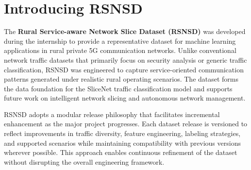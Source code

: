 \documentclass[12pt,a4paper]{report}
\begin{document}
\section{Introducing RSNSD}
\label{sec:rsnsd}

The \textbf{Rural Service-aware Network Slice Dataset (RSNSD)} was developed during the internship to provide a representative dataset for machine learning applications in rural private 5G communication networks. Unlike conventional network traffic datasets that primarily focus on security analysis or generic traffic classification, RSNSD was engineered to capture service-oriented communication patterns generated under realistic rural operating scenarios. The dataset forms the data foundation for the SliceNet traffic classification model and supports future work on intelligent network slicing and autonomous network management.

RSNSD adopts a modular release philosophy that facilitates incremental enhancement as the major project progresses. Each dataset release is versioned to reflect improvements in traffic diversity, feature engineering, labeling strategies, and supported scenarios while maintaining compatibility with previous versions wherever possible. This approach enables continuous refinement of the dataset without disrupting the overall engineering framework.
\end{document}

